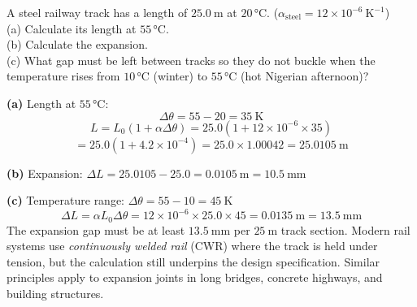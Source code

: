 \begin{diagbox}
\begin{center}
\end{center}
\end{diagbox}

\begin{examplebox}[13.3]
A steel railway track has a length of $25.0\ \text{m}$
at $20\,°\text{C}$.
($\alpha_{\text{steel}} = 12\times10^{-6}\ \text{K}^{-1}$)\\
(a) Calculate its length at $55\,°\text{C}$.\\
(b) Calculate the expansion.\\
(c) What gap must be left between tracks so they
do not buckle when the temperature rises from
$10\,°\text{C}$ (winter) to $55\,°\text{C}$ (hot
Nigerian afternoon)?
\end{examplebox}

\begin{solutionbox}
\textbf{(a)} Length at $55\,°\text{C}$:
\[
  \Delta\theta = 55 - 20 = 35\ \text{K}
\]
\[
  L = L_0(1 + \alpha\Delta\theta)
  = 25.0\left(1 + 12\times10^{-6} \times 35\right)
\]
\[
 = 25.0(1 + 4.2\times10^{-4})
  = 25.0 \times 1.00042
  = 25.0105\ \text{m}
\]

\textbf{(b)} Expansion:
$\Delta L = 25.0105 - 25.0 = 0.0105\ \text{m}
= 10.5\ \text{mm}$

\textbf{(c)} Temperature range: $\Delta\theta = 55 - 10
= 45\ \text{K}$
\[
  \Delta L = \alpha L_0 \Delta\theta
  = 12\times10^{-6} \times 25.0 \times 45
  = 0.0135\ \text{m} = 13.5\ \text{mm}
\]
The expansion gap must be at least $13.5\ \text{mm}$
per $25\ \text{m}$ track section. Modern rail systems
use \textit{continuously welded rail} (CWR) where the
track is held under tension, but the calculation
still underpins the design specification. Similar
principles apply to expansion joints in long bridges,
concrete highways, and building structures.
\end{solutionbox}

